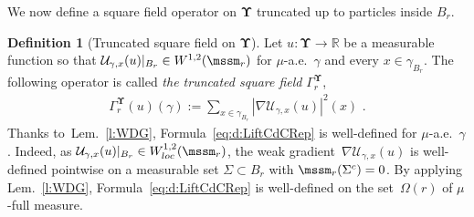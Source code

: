 \documentclass[11pt,letterpaper]{amsart}
\newcommand{\R}{{\mathbb R}}
\newcommand{\trid}{{\star}}
\newcommand{\comma}{\,\,\mathrm{,}\;\,}
\newcommand{\fstop}{\,\,\mathrm{.}}
\newcommand{\cdc}{\Gamma}
\newcommand{\Cyl}[1]{\mcF^\dUpsilon\mcC^\infty_b(#1)}
\newcommand{\Dz}{\mcD} %
\newcommand{\QP}{{\mu}}
\newcommand{\dUpsilon}{{\mathbf \Upsilon}}
\newcommand{\U}{\dUpsilon}
\renewcommand{\1}{\mathbf 1}
\numberwithin{equation}{section}
\theoremstyle{plain}
\theoremstyle{definition}
\newtheorem{defs}[thm]{Definition}%
\theoremstyle{remark}
\begin{document}
We now define a square field operator on $\U$ truncated up to particles inside $B_r$.
\begin{defs}[Truncated square field on $\U$]\label{d:DT}
Let $u:\U \to \R$ be a measurable function so that $\mathcal U_{\gamma, x}(u)|_{B_r} \in W^{1,2}(\mssm_r)$ for $\QP$-a.e.~$\gamma$ and every $x \in \gamma_{B_r}$. 
 The following operator is called {\it the truncated square field} $\Gamma^\U_r$, 
\begin{equation}\label{eq:d:LiftCdCRep}
\begin{gathered}
\cdc^{\dUpsilon}_r(u)(\gamma):= \sum_{x\in \gamma_{B_r}} |\nabla \mathcal U_{\gamma, x}(u)|^2(x)\fstop
\end{gathered}
\end{equation}
Thanks to~Lem.~\ref{l:WDG}, Formula~\eqref{eq:d:LiftCdCRep}  is well-defined for $\QP$-a.e.~$\gamma$. Indeed, as $\mathcal U_{\gamma, x}(u)|_{B_r}\in W^{1,2}_{loc}(\mssm_r)$, the weak gradient~$\nabla \mathcal U_{\gamma, x}(u)$ is well-defined pointwise on a measurable set $\Sigma \subset B_r$ with $\mssm_r(\Sigma^c)=0$. By applying  Lem.~\ref{l:WDG}, Formula~\eqref{eq:d:LiftCdCRep} is well-defined on the set~$\Omega(r)$ of $\QP$-full measure. 
\end{defs} 
\end{document}
